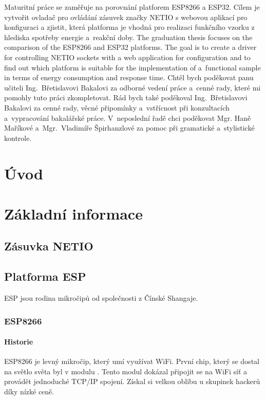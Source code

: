 \documentclass[a4paper, 12pt]{report}
\begin{document}
	\titulniStrana
	\anotace
		Maturitní práce se zaměřuje na porovnání platforem ESP8266 a ESP32. Cílem je vytvořit ovladač pro ovládání zásuvek značky NETIO s webovou aplikací pro konfiguraci a zjistit, která platforma je vhodná pro realizaci funkčního vzorku z hlediska spotřeby energie a~reakční doby.
	\annotation
		The graduation thesis focuses on the comparison of the ESP8266 and ESP32 platforms. The goal is to create a driver for controlling NETIO sockets with a web application for configuration and to find out which platform is suitable for the implementation of a~functional sample in terms of energy consumption and response time.
	\podekovani
		Chtěl bych poděkovat panu učiteli Ing.~Břetislavovi Bakalovi za odborné vedení práce a~cenné rady, které mi pomohly tuto práci zkompletovat. Rád bych také poděkoval Ing.~Břetislavovi Bakalovi za cenné rady, věcné připomínky a~vstřícnost při konzultacích a~vypracování bakalářské práce. V~neposlední řadě chci poděkovat Mgr. Haně Maříkové a~Mgr.~Vladimíře Špirhanzlové za pomoc při gramatické a~stylistické kontrole.
	\tableofcontents

	\chapter{Úvod}
	\chapter{Základní informace}
		\section{Zásuvka NETIO}
		\section{Platforma ESP}
			ESP jsou rodina mikročipů od společnosti  z Čínské Shangaje.
			\subsection{ESP8266}
				\subsubsection{Historie}
					ESP8266 je levný mikročip, který umí využívat WiFi. První chip, který se dostal na světlo světa byl v modulu . Tento modul dokázal připojit se na WiFi síť a provádět jednoduché TCP/IP spojení. Získal si velkou oblibu u skupinek hackerů díky nízké ceně.
\end{document}
